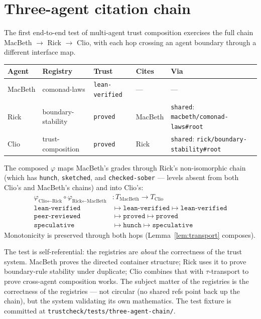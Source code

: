 \documentclass[11pt,a4paper]{article}
\newcommand{\level}[1]{\texttt{#1}}
\theoremstyle{plain}
\theoremstyle{definition}
\begin{document}
\section{Three-agent citation chain}
\label{sec:three-agent}

The first end-to-end test of multi-agent trust composition exercises the
full chain MacBeth $\to$ Rick $\to$ Clio, with each hop crossing an agent
boundary through a different interface map.

\begin{center}
\begin{tabular}{lllll}
\toprule
Agent & Registry & Trust & Cites & Via \\
\midrule
MacBeth & comonad-laws & \level{lean-verified} & --- & --- \\
Rick & boundary-stability & \level{proved} & MacBeth & \texttt{shared}: \texttt{macbeth/comonad-laws\#root} \\
Clio & trust-composition & \level{proved} & Rick & \texttt{shared}: \texttt{rick/boundary-stability\#root} \\
\bottomrule
\end{tabular}
\end{center}

The composed $\varphi$ maps MacBeth's grades through Rick's non-isomorphic
chain (which has \level{hunch}, \level{sketched}, and \level{checked-sober}
--- levels absent from both Clio's and MacBeth's chains) and into Clio's:
%
\begin{align*}
\varphi_{\text{Clio}\leftarrow\text{Rick}} \circ \varphi_{\text{Rick}\leftarrow\text{MacBeth}} &: T_{\text{MacBeth}} \to T_{\text{Clio}} \\
\level{lean-verified} &\mapsto \level{lean-verified} \mapsto \level{lean-verified} \\
\level{peer-reviewed} &\mapsto \level{proved} \mapsto \level{proved} \\
\level{speculative} &\mapsto \level{hunch} \mapsto \level{speculative}
\end{align*}
%
Monotonicity is preserved through both hops (Lemma~\ref{lem:transport}
composes).

The test is self-referential: the registries are \emph{about} the
correctness of the trust system. MacBeth proves the directed container
structure; Rick uses it to prove boundary-rule stability under duplicate;
Clio combines that with $\tau$-transport to prove cross-agent composition
works. The subject matter of the registries is the correctness of the
registries --- not circular (no shared refs point back up the chain), but
the system validating its own mathematics. The test fixture is committed
at \texttt{trustcheck/tests/three-agent-chain/}.
\end{document}
